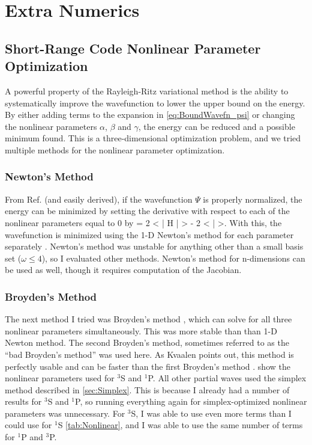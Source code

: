 \documentclass[Dissertation.tex]{subfiles}
\begin{document}
\chapter{Extra Numerics}
\label{chp:ExtraNumerics}


\section{Short-Range Code Nonlinear Parameter Optimization}
\label{sec:BoundOptimization}

A powerful property of the Rayleigh-Ritz variational method is the 
ability to systematically improve the wavefunction to lower the upper bound 
on the energy. By either adding terms to the expansion in
\ref{eq:BoundWavefn_psi} or changing the nonlinear parameters $\alpha$,
$\beta$ and $\gamma$, the energy can be reduced and a possible minimum
found. This is a three-dimensional optimization problem, and we tried 
multiple methods for the nonlinear parameter optimization.

\subsection{Newton's Method}
\label{sec:Newton}
From Ref. \cite{Yan1999} (and easily derived), if the wavefunction $\Psi$
is properly normalized, the energy can be minimized by setting the
derivative with respect to each of the nonlinear parameters equal to 0 by
\beq
{} = 2 \left< \Psi \Big| H \Big| \frac{\partial\Psi}{\partial \alpha} \right> - 2 \left< \Psi \Big| \frac{\partial\Psi}{\partial \alpha} \right>.
\label{eq:EnergyDerivativeNorm}
\eeq
With this, the wavefunction is minimized using the 1-D Newton's method for 
each parameter separately \cite{Sauer2006}. Newton's method was unstable for 
anything other than a small basis set ($\omega \leq 4$), so I evaluated other 
methods. Newton's method for n-dimensions can be used as well, though it 
requires computation of the Jacobian.

\subsection{Broyden's Method}
\label{sec:Broyden}

The next method I tried was Broyden's method \cite{Sauer2006}, which can 
solve for all three nonlinear parameters simultaneously. This was more stable 
than than 1-D Newton method. The second Broyden's method, sometimes referred 
to as the ``bad Broyden's method'' was used here. As Kvaalen points out, this 
method is perfectly usable and can be faster than the first Broyden's method 
\cite{Kvaalen1991}. 
show the nonlinear parameters used for $^3$S and $^1$P. All other partial waves
used the simplex method described in \cref{sec:Simplex}. This is because I
already had a number of results for $^3$S and $^1$P, so running everything
again for simplex-optimized nonlinear parameters was unnecessary. For $^3$S,
I was able to use even more terms than I could use for $^1$S \cref{tab:Nonlinear},
and I was able to use the same number of terms for $^1$P and $^3$P.
\end{document}
